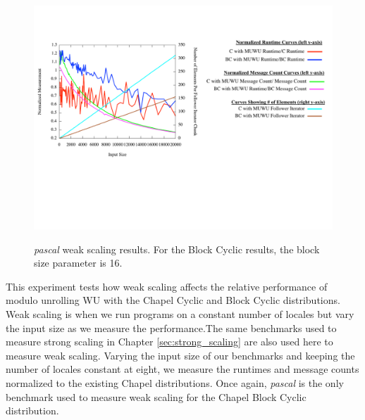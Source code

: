 \begin{figure}
\begin{center}
\includegraphics[width=\linewidth]{./Figures/input_variation_exp/pascal.pdf}
\renewcommand{\baselinestretch}{1}
\small\normalsize
\begin{quote}
\caption[\textit{pascal} weak scaling results]{\textit{pascal} weak scaling results. For the Block Cyclic results, the block size parameter is 16.\label{pascal_weak_scaling}}
\end{quote}
\end{center}
\end{figure}

This experiment tests how weak scaling affects the relative performance of modulo unrolling WU with the Chapel Cyclic and Block Cyclic distributions. Weak scaling is when we run programs on a constant number of locales but vary the input size as we measure the performance.The same benchmarks used to measure strong scaling in Chapter \ref{sec:strong_scaling} are also used here to measure weak scaling. Varying the input size of our benchmarks and keeping the number of locales constant at eight, we measure the runtimes and message counts normalized to the existing Chapel distributions. Once again, \textit{pascal} is the only benchmark used to measure weak scaling for the Chapel Block Cyclic distribution. 

